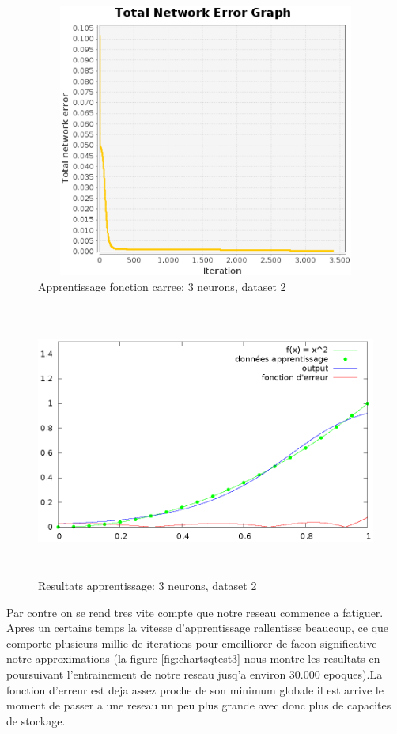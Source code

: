 \documentclass[twoside,openright,a4paper,11pt,french]{article}
\begin{document}
\begin{figure}[h]
\centering
\includegraphics[width=12cm,height=9cm]{./pics/sqtest2.eps}
\caption{Apprentissage fonction carree: 3 neurons, dataset 2}
\label{fig:sqtest2}
\end{figure}

\begin{figure}[h]
\centering
\includegraphics[width=12cm,height=9cm]{./pics/chartsqtest2.eps}
\caption{Resultats apprentissage: 3 neurons, dataset 2}
\label{fig:chartsqtest2}
\end{figure}

Par contre on se rend tres vite compte que notre reseau commence a fatiguer.
Apres un certains temps la vitesse d'apprentissage rallentisse beaucoup, 
ce que comporte plusieurs millie de iterations pour emeilliorer de facon 
significative notre approximations (la figure \ref{fig:chartsqtest3} nous
montre les resultats en poursuivant l'entrainement de notre reseau jusq'a
environ 30.000 epoques).La fonction d'erreur est deja assez proche de son minimum 
globale il est arrive le moment de passer a une reseau un peu plus grande 
avec donc plus de capacites de stockage.
\end{document}
